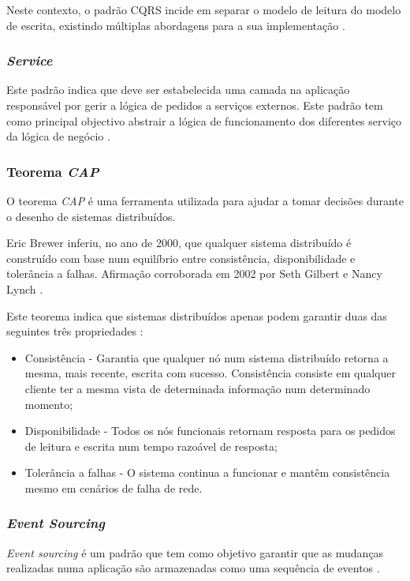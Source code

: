 Neste contexto, o padrão CQRS incide em separar o modelo de leitura do modelo de escrita, existindo múltiplas abordagens para a sua implementação \cite{cqrs}.

\subsubsection{\emph{Service} \label{service_pattern}}
Este padrão indica que deve ser estabelecida uma camada na aplicação responsável por gerir a lógica de pedidos a serviços externos. Este padrão tem como principal objectivo abstrair a lógica de funcionamento dos diferentes serviço da lógica de negócio \cite{service_design_patterns}.

\subsubsection{Teorema \emph{\acrfull{CAP}}} \label{cap_theorem}
O teorema \emph{\acrshort{CAP}} é uma ferramenta utilizada para ajudar a tomar decisões durante o desenho de sistemas distribuídos.

Eric Brewer inferiu, no ano de 2000, que qualquer sistema distribuído é construído com base num equilíbrio entre consistência, disponibilidade e tolerância a falhas. Afirmação corroborada em 2002 por Seth Gilbert e Nancy Lynch \cite{microservices_up_and_running}.

Este teorema indica que sistemas distribuídos apenas podem garantir duas das seguintes três propriedades \cite{cap_theorem}:

\begin{itemize}
    \item Consistência - Garantia que qualquer nó num sistema distribuído retorna a mesma, mais recente, escrita com sucesso. Consistência consiste em qualquer cliente ter a mesma vista de determinada informação num determinado momento;
    \item Disponibilidade - Todos os nós funcionais retornam resposta para os pedidos de leitura e escrita num tempo razoável de resposta;
    \item Tolerância a falhas - O sistema continua a funcionar e mantêm consistência mesmo em cenários de falha de rede.
\end{itemize}

\subsubsection{\emph{Event Sourcing} \label{event_sourcing}}
\emph{Event sourcing} é um padrão que tem como objetivo garantir que as mudanças realizadas numa aplicação são armazenadas como uma sequência de eventos \cite{clean_code}.

